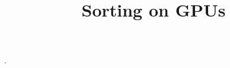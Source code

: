 \documentclass{article}
\title{Sorting on GPUs}
\begin{document}
\maketitle

\citep{ha2010implicit}.




\end{document}
